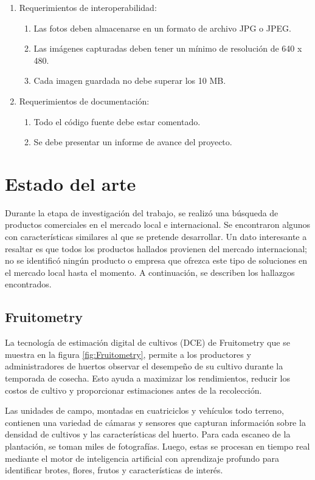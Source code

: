 \begin{enumerate}
    \item Requerimientos de interoperabilidad:
		\begin{enumerate}
			\item Las fotos deben almacenarse en un formato de archivo JPG o JPEG.
			\item Las imágenes capturadas deben tener un mínimo de resolución de 640 x 480.
            \item Cada imagen guardada no debe superar los 10 MB.
		\end{enumerate}
    \item Requerimientos de documentación:
		\begin{enumerate}
			\item Todo el código fuente debe estar comentado.
			\item Se debe presentar un informe de avance del proyecto.
		\end{enumerate}
\end{enumerate}


\section{Estado del arte}

Durante la etapa de investigación del trabajo, se realizó una búsqueda de productos comerciales en el mercado local e internacional. Se encontraron algunos con características similares al que se pretende desarrollar. Un dato interesante a resaltar es que todos los productos hallados provienen del mercado internacional; no se identificó ningún producto o empresa que ofrezca este tipo de soluciones en el mercado local hasta el momento. A continuación, se describen los hallazgos encontrados.

\subsection{Fruitometry}

La tecnología de estimación digital de cultivos (DCE) de Fruitometry que se muestra en la figura \ref{fig:Fruitometry}, permite a los productores y administradores de huertos observar el desempeño de su cultivo durante la temporada de cosecha. Esto ayuda a maximizar los rendimientos, reducir los costos de cultivo y proporcionar estimaciones antes de la recolección.

Las unidades de campo, montadas en cuatriciclos y vehículos todo terreno, contienen una variedad de cámaras y sensores que capturan información sobre la densidad de cultivos y las características del huerto. Para cada escaneo de la plantación, se toman miles de fotografías. Luego, estas se procesan en tiempo real mediante el motor de inteligencia artificial con aprendizaje profundo para identificar brotes, flores, frutos y características de interés.

